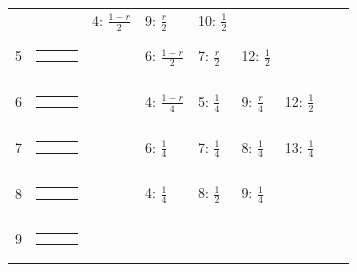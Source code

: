 \documentclass[9pt,letterpaper,twoside]{article}
\begin{document}
{\begin{center}
\begin{tabular}{cccllllll}
&
& 4: $\frac{1-r}{2}$
& 9: $\frac{r}{2}$
& 10: $\frac{1}{2}$
& & & \\
5 &
{\renewcommand{\arraystretch}{0.3}
\renewcommand{\tabcolsep}{0.5mm}
\parbox[b][3mm][c]{12mm}{
\begin{tabular}{|p{2mm}|p{2mm}||p{2mm}|} \hline
$\bullet$ & $\bullet$ &           \\
$\bullet$ &           &           \\ \hline
\end{tabular}}}
&
& 6: $\frac{1-r}{2}$
& 7: $\frac{r}{2}$
& 12: $\frac{1}{2}$
& & & \\
6 &
{\renewcommand{\arraystretch}{0.3}
\renewcommand{\tabcolsep}{0.5mm}
\parbox[b][3mm][c]{12mm}{
\begin{tabular}{|p{2mm}|p{2mm}||p{2mm}|} \hline
$\bullet$ &           & $\bullet$ \\
$\bullet$ &           &           \\ \hline
\end{tabular}}}
&
& 4: $\frac{1-r}{4}$
& 5: $\frac{1}{4}$
& 9: $\frac{r}{4}$
& 12: $\frac{1}{2}$
& & \\
7 &
{\renewcommand{\arraystretch}{0.3}
\renewcommand{\tabcolsep}{0.5mm}
\parbox[b][3mm][c]{12mm}{
\begin{tabular}{|p{2mm}|p{2mm}||p{2mm}|} \hline
$\bullet$ &           & $\bullet$ \\
          & $\bullet$ &           \\ \hline
\end{tabular}}}
&
& 6: $\frac{1}{4}$
& 7: $\frac{1}{4}$
& 8: $\frac{1}{4}$
& 13: $\frac{1}{4}$
& & \\
8 &
{\renewcommand{\arraystretch}{0.3}
\renewcommand{\tabcolsep}{0.5mm}
\parbox[b][3mm][c]{12mm}{
\begin{tabular}{|p{2mm}|p{2mm}||p{2mm}|} \hline
$\bullet$ &           &           \\
          &           & $\bullet$ \\ \hline
\end{tabular}}}
&
& 4: $\frac{1}{4}$
& 8: $\frac{1}{2}$
& 9: $\frac{1}{4}$
& & & \\
9 &
{\renewcommand{\arraystretch}{0.3}
\renewcommand{\tabcolsep}{0.5mm}
\parbox[b][3mm][c]{12mm}{
\begin{tabular}{|p{2mm}|p{2mm}||p{2mm}|} \hline
$\bullet$ &           &           \\
          & $\bullet$ &           \\ \hline
\end{tabular}}}
&

\end{tabular}
\end{center}}
\end{document}
